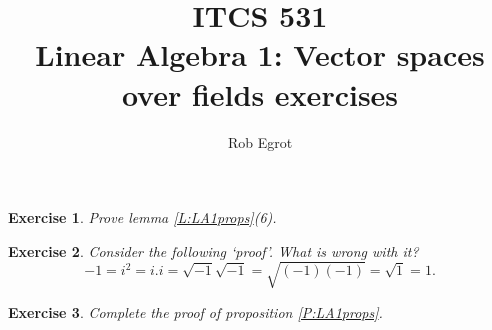 \documentclass{article}
\title{ITCS 531 \\Linear Algebra 1: Vector spaces over fields exercises}
\author{Rob Egrot}
\date{}
\theoremstyle{plain}
\newtheorem{Q}{Exercise}{\bfseries}{\upshape}
\newcommand{\bR}{\mathbb{R}}
\begin{document}
\maketitle

\begin{Q}\label{\prefix Q:LA1props}
Prove lemma \ref{L:LA1props}(6).
\end{Q}
\begin{comment}
\textbf{Solution:} Let $\alpha = a+bi$, let $\beta = c+di$, and let $\gamma = e +fi$.
\begin{enumerate}[]
\item 6) \begin{align*}
(a+ bi)((c+di)+ (e+fi)) &= (a+bi)((c+e) + (d+f)i) \\
&= a(c+e) - b(d+f) + (b(c+e) + a(d+f))i\\
&=ac + ae -bd - bf +(bc+be + ad +af)i.
\end{align*}
Also,
\begin{align*}
(a+ bi)(c+di) + (a+ bi)(e+fi) &= (ac - bd) +(ad + bc)i + (ae - bf) + (af + be)i \\
&= ac+ ae - bd - bf +(ad + bc +af + be)i.
\end{align*}
These two things are the same, so we have distributivity.
\end{enumerate}
\end{comment}

\begin{Q}
Consider the following `proof'. What is wrong with it?
\[-1 = i^2 = i.i = \sqrt{-1}\sqrt{-1} = \sqrt{(-1)(-1)} = \sqrt 1 = 1.\]
\end{Q}
\begin{comment}
\textbf{Solution:}
The problem is that $(-1\times -1)^\frac{1}{2}$ does not equal $(-1)^\frac{1}{2}(-1)^\frac{1}{2}$. We think it should because when $a,b,c\in\bR$ are all positive we have $(ab)^c = a^cb^c$ (it's not obvious that this is true for irrational values of $c$, or even exactly what it means to take an irrational power, but it's obviously true for rational $c$, and it turns out to be true for irrational values too). What the argument above shows it that this is no longer always true when we have negative values for $a$ and $b$. 
\end{comment}

\begin{Q}\label{\prefix Q:LA1inv}
Complete the proof of proposition \ref{P:LA1props}. 
\end{Q}
\begin{comment}
\textbf{Solution:}
We must show $-1v = -v$ for all $v\in V$. By proposition \ref{P:LA1props}(3) we have $0v = 0$. So $(1-1)v = 0$, and so $v + (-1)v = 0$ by definition \ref{D:LA1vec}(8) and (6). So $(-1)v = - v$ by proposition \ref{P:LA1props}(2). 

\end{comment}
\end{document}
